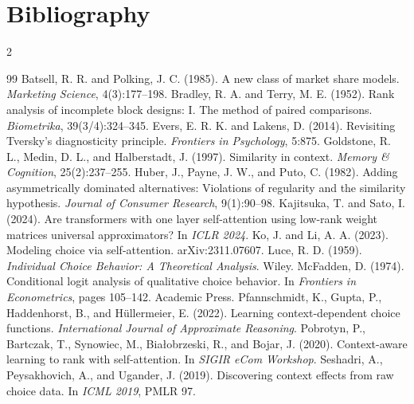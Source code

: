 \documentclass[11pt,a4paper]{article}
\numberwithin{table}{section}
\numberwithin{figure}{section}
\numberwithin{equation}{section}
\begin{document}
\section*{Bibliography}
\begin{multicols}{2}
\footnotesize
\renewcommand{\section}[2]{}
\setlength{\bibsep}{2pt}
\begin{thebibliography}{99}
 Batsell, R. R. and Polking, J. C. (1985). A new class of market share models. \emph{Marketing Science}, 4(3):177--198.
 Bradley, R. A. and Terry, M. E. (1952). Rank analysis of incomplete block designs: I. The method of paired comparisons. \emph{Biometrika}, 39(3/4):324--345.
 Evers, E. R. K. and Lakens, D. (2014). Revisiting Tversky's diagnosticity principle. \emph{Frontiers in Psychology}, 5:875.
 Goldstone, R. L., Medin, D. L., and Halberstadt, J. (1997). Similarity in context. \emph{Memory \& Cognition}, 25(2):237--255.
 Huber, J., Payne, J. W., and Puto, C. (1982). Adding asymmetrically dominated alternatives: Violations of regularity and the similarity hypothesis. \emph{Journal of Consumer Research}, 9(1):90--98.
 Kajitsuka, T. and Sato, I. (2024). Are transformers with one layer self-attention using low-rank weight matrices universal approximators? In \emph{ICLR 2024}.
 Ko, J. and Li, A. A. (2023). Modeling choice via self-attention. arXiv:2311.07607.
 Luce, R. D. (1959). \emph{Individual Choice Behavior: A Theoretical Analysis}. Wiley.
 McFadden, D. (1974). Conditional logit analysis of qualitative choice behavior. In \emph{Frontiers in Econometrics}, pages 105--142. Academic Press.
 Pfannschmidt, K., Gupta, P., Haddenhorst, B., and H\"ullermeier, E. (2022). Learning context-dependent choice functions. \emph{International Journal of Approximate Reasoning}.
 Pobrotyn, P., Bartczak, T., Synowiec, M., Bia{\l}obrzeski, R., and Bojar, J. (2020). Context-aware learning to rank with self-attention. In \emph{SIGIR eCom Workshop}.
 Seshadri, A., Peysakhovich, A., and Ugander, J. (2019). Discovering context effects from raw choice data. In \emph{ICML 2019}, PMLR 97.

\end{thebibliography}
\end{multicols}
\end{document}
